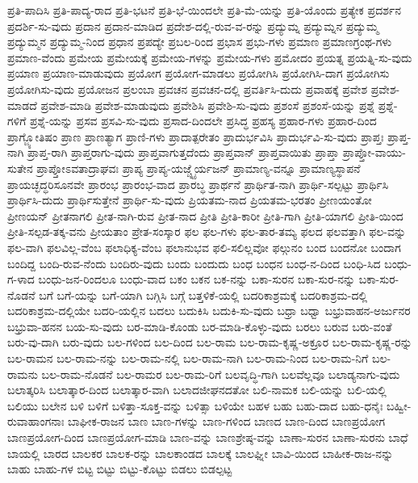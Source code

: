 {ಪ್ರತಿ-ಪಾದಿಸಿ
ಪ್ರತಿ-ಪಾದ್ಯ-ರಾದ
ಪ್ರತಿ-ಭಟನೆ
ಪ್ರತಿ-ಭೆ-ಯಿಂದಲೇ
ಪ್ರತಿ-ಮೆ-ಯನ್ನು
ಪ್ರತಿ-ಯೊಂದು
ಪ್ರತ್ಯೇಕ
ಪ್ರದರ್ಶನ
ಪ್ರದರ್ಶಿ-ಸು-ವುದು
ಪ್ರದಾನ
ಪ್ರದಾನ-ಮಾಡಿದ
ಪ್ರದೇಶ-ದಲ್ಲಿ-ರುವ-ವ-ರನ್ನು
ಪ್ರದ್ಯುಮ್ನ
ಪ್ರದ್ಯುಮ್ನನ
ಪ್ರದ್ಯುಮ್ಮ
ಪ್ರದ್ಯುಮ್ಮನ
ಪ್ರದ್ಯುಮ್ಮ-ನಿಂದ
ಪ್ರಧಾನ
ಪ್ರಪದ್ಯೇ
ಪ್ರಬಲ-ರಿಂದ
ಪ್ರಭಾಸ
ಪ್ರಭು-ಗಳು
ಪ್ರಮಾಣ
ಪ್ರಮಾಣಗ್ರಂಥ-ಗಳು
ಪ್ರಮಾಣ-ವೆಂದು
ಪ್ರಮೇಯ
ಪ್ರಮೇಯಕ್ಕೆ
ಪ್ರಮೇಯ-ಗಳನ್ನು
ಪ್ರಮೇಯ-ಗಳು
ಪ್ರಮೋದಂ
ಪ್ರಯತ್ನ
ಪ್ರಯತ್ನಿ-ಸು-ವುದು
ಪ್ರಯಾಣ
ಪ್ರಯಾಣ-ಮಾಡುವುದು
ಪ್ರಯೋಗ
ಪ್ರಯೋಗ-ಮಾಡಲು
ಪ್ರಯೋಗಿಸಿ
ಪ್ರಯೋಗಿಸಿ-ದಾಗ
ಪ್ರಯೋಗಿಸು
ಪ್ರಯೋಗಿಸು-ವುದು
ಪ್ರಯೋಜನ
ಪ್ರಲಂಬಾ
ಪ್ರವಚನ
ಪ್ರವಚನ-ದಲ್ಲಿ
ಪ್ರವರ್ತಿಸಿ-ದುದು
ಪ್ರವಾಹಕ್ಕೆ
ಪ್ರವೇಶ
ಪ್ರವೇಶ-ಮಾಡದೆ
ಪ್ರವೇಶ-ಮಾಡಿ
ಪ್ರವೇಶ-ಮಾಡುವುದು
ಪ್ರವೇಶಿಸಿ
ಪ್ರವೇಶಿ-ಸು-ವುದು
ಪ್ರಶಂಸೆ
ಪ್ರಶಂಸೆ-ಯನ್ನು
ಪ್ರಶ್ನೆ
ಪ್ರಶ್ನೆ-ಗಳಿಗೆ
ಪ್ರಶ್ನೆ-ಯನ್ನು
ಪ್ರಸವ
ಪ್ರಸವಿ-ಸು-ವುದು
ಪ್ರಸಾದ-ದಿಂದಲೇ
ಪ್ರಸಿದ್ಧ
ಪ್ರಹಸ್ಯ
ಪ್ರಹಾರ-ಗಳು
ಪ್ರಹಾರ-ದಿಂದ
ಪ್ರಾಗ್ಜ್ಯೋತಿಷಂ
ಪ್ರಾಣ
ಪ್ರಾಣತ್ಯಾಗ
ಪ್ರಾಣಿ-ಗಳು
ಪ್ರಾದಾತ್ಪರೇತಂ
ಪ್ರಾದುರ್ಭವಿಸಿ
ಪ್ರಾದುರ್ಭವಿ-ಸು-ವುದು
ಪ್ರಾಪ್ತಃ
ಪ್ರಾಪ್ತ-ನಾಗಿ
ಪ್ರಾಪ್ತ-ರಾಗಿ
ಪ್ರಾಪ್ತರಾಗು-ವುದು
ಪ್ರಾಪ್ತವಾಗುತ್ತದೆಂದು
ಪ್ರಾಪ್ತವಾನ್
ಪ್ರಾಪ್ತವಾಯಿತು
ಪ್ರಾಪ್ತಾ
ಪ್ರಾಪ್ತೋ-ವಾಯು-ಸುತೇನ
ಪ್ರಾಪ್ತೋಽವತಾದ್ರಾಘವಃ
ಪ್ರಾಪ್ಯ
ಪ್ರಾಪ್ಯ-ಯಜ್ಚ್ನೈರ್ಯಜನ್
ಪ್ರಾಮಾಣ್ಯ-ವನ್ನೂ
ಪ್ರಾಮಾಣ್ಯಸ್ಥಾಪನೆ
ಪ್ರಾಯಚ್ಛದ್ಧರಿಸೂನವೇ
ಪ್ರಾರಂಭ
ಪ್ರಾರಂಭ-ವಾದ
ಪ್ರಾರಬ್ಧ
ಪ್ರಾರ್ಥನೆ
ಪ್ರಾರ್ಥಿತ-ನಾಗಿ
ಪ್ರಾರ್ಥಿ-ಸಲ್ಪಟ್ಟು
ಪ್ರಾರ್ಥಿಸಿ
ಪ್ರಾರ್ಥಿಸಿ-ದುದು
ಪ್ರಾರ್ಥಿಸುತ್ತೇನೆ
ಪ್ರಾರ್ಥಿ-ಸು-ವುದು
ಪ್ರಿಯತಮ-ನಾದ
ಪ್ರಿಯತಮ-ಭರತಂ
ಪ್ರೀಣಯಂತೋ
ಪ್ರೀಣಯನ್
ಪ್ರೀತನಾಗಲಿ
ಪ್ರೀತ-ನಾಗಿ-ರುವ
ಪ್ರೀತ-ನಾದ
ಪ್ರೀತಿ
ಪ್ರೀತಿ-ಕಾರೀ
ಪ್ರೀತಿ-ಗಾಗಿ
ಪ್ರೀತಿ-ಯಾಗಲಿ
ಪ್ರೀತಿ-ಯಿಂದ
ಪ್ರೀತಿ-ಸಲ್ಪಡ-ತಕ್ಕ-ವನು
ಪ್ರೀಯತಾಂ
ಪ್ರೇತ-ಸಂಸ್ಕಾರ
ಫಲ
ಫಲ-ಗಳು
ಫಲ-ತಾರ-ತಮ್ಯ
ಫಲದ
ಫಲವತ್ತಾಗಿ
ಫಲ-ವನ್ನು
ಫಲ-ವಾಗಿ
ಫಲವಿಲ್ಲ-ವೆಂಬ
ಫಲಾಧಿಕ್ಯ-ವೆಂಬ
ಫಲಾನುಭವ
ಫಲಿ-ಸಲಿಲ್ಲವೋ
ಫಲ್ಗುನಂ
ಬಂದ
ಬಂದನೋ
ಬಂದಾಗ
ಬಂದಿದ್ದ
ಬಂದಿ-ರುವ-ನೆಂದು
ಬಂದಿರು-ವುದು
ಬಂದು
ಬಂದುದು
ಬಂಧ
ಬಂಧನ
ಬಂಧ-ನ-ದಿಂದ
ಬಂಧಿ-ಸಿದ
ಬಂಧು-ಗ-ಳಾದ
ಬಂಧು-ಜನ-ರಿಂದಲೂ
ಬಂಧು-ವಾದ
ಬಕಂ
ಬಕನ
ಬಕ-ನನ್ನು
ಬಕಾ-ಸುರನ
ಬಕಾ-ಸುರ-ನನ್ನು
ಬಕಾ-ಸುರ-ನೊಡನೆ
ಬಗೆ
ಬಗೆ-ಯನ್ನು
ಬಗೆ-ಯಾಗಿ
ಬಗ್ಗಿಸಿ
ಬಗ್ಗೆ
ಬತ್ತಳಿಕೆ-ಯಲ್ಲಿ
ಬದರಿಕಾಶ್ರಮಕ್ಕೆ
ಬದರಿಕಾಶ್ರಮ-ದಲ್ಲಿ
ಬದರಿಕಾಶ್ರಮ-ದಲ್ಲಿಯೇ
ಬದರಿ-ಯಲ್ಲಿನ
ಬದಲು
ಬದುಕಿಸಿ
ಬದುಕಿ-ಸು-ವುದು
ಬಧ್ರಾ
ಬಧ್ವಾ
ಬಭ್ರುವಾಹನ-ಅರ್ಜುನರ
ಬಭ್ರುವಾ-ಹನನ
ಬಯ-ಸು-ವುದು
ಬರ-ಮಾಡಿ-ಕೊಂಡು
ಬರ-ಮಾಡಿ-ಕೊಳ್ಳು-ವುದು
ಬರಲು
ಬರುವ
ಬರು-ವಂತೆ
ಬರು-ವು-ದಾಗಿ
ಬರು-ವುದು
ಬಲ-ಗಳಿಂದ
ಬಲ-ದಿಂದ
ಬಲ-ರಾಮ
ಬಲ-ರಾಮ-ಕೃಷ್ಣ-ಅಕ್ರೂರ
ಬಲ-ರಾಮ-ಕೃಷ್ಣ-ರನ್ನು
ಬಲ-ರಾಮನ
ಬಲ-ರಾಮ-ನನ್ನು
ಬಲ-ರಾಮ-ನಲ್ಲಿ
ಬಲ-ರಾಮ-ನಾಗಿ
ಬಲ-ರಾಮ-ನಿಂದ
ಬಲ-ರಾಮ-ನಿಗೆ
ಬಲ-ರಾಮನು
ಬಲ-ರಾಮ-ನೊಡನೆ
ಬಲ-ರಾಮರ
ಬಲ-ರಾಮ-ರಿಗೆ
ಬಲವೃದ್ಧಿ-ಗಾಗಿ
ಬಲವೆಲ್ಲವೂ
ಬಲಾಡ್ಯನಾಗು-ವುದು
ಬಲಾತ್ಕರಿಸಿ
ಬಲಾತ್ಕಾರ-ದಿಂದ
ಬಲಾತ್ಕಾರ-ವಾಗಿ
ಬಲಾದಜೀಘನದತೋ
ಬಲಿ-ನಾಮಕ
ಬಲಿ-ಯನ್ನು
ಬಲಿ-ಯಲ್ಲಿ
ಬಲಿಯು
ಬಲೇನ
ಬಳಿ
ಬಳಿಗೆ
ಬಳಿತ್ತಾ-ಸೂಕ್ತ-ವನ್ನು
ಬಳಿತ್ಸಾ
ಬಳಿಯೇ
ಬಹಳ
ಬಹು
ಬಹು-ದಾದ
ಬಹು-ಧನೈಃ
ಬಹ್ವೀ-ರುವಾಹಾಂಗನಾಃ
ಬಾಘೀಕ-ರಾಜನ
ಬಾಣ
ಬಾಣ-ಗಳನ್ನು
ಬಾಣ-ಗಳಿಂದ
ಬಾಣದ
ಬಾಣ-ದಿಂದ
ಬಾಣಪ್ರಯೋಗ
ಬಾಣಪ್ರಯೋಗ-ದಿಂದ
ಬಾಣಪ್ರಯೋಗ-ಮಾಡಿ
ಬಾಣ-ವನ್ನು
ಬಾಣಶ್ರೇಷ್ಠ-ವನ್ನು
ಬಾಣಾ-ಸುರನ
ಬಾಣಾ-ಸುರನು
ಬಾಧೆ
ಬಾಯಲ್ಲಿ
ಬಾರದ
ಬಾಲಕರ
ಬಾಲಕ-ರನ್ನು
ಬಾಲಕಾಂಡದ
ಬಾಲಕ್ಕೆ
ಬಾಲಘ್ನೀ
ಬಾವಿ-ಯಿಂದ
ಬಾಹೀಕ-ರಾಜ-ನನ್ನು
ಬಾಹು
ಬಾಹು-ಗಳ
ಬಿಟ್ಟ
ಬಿಟ್ಟು
ಬಿಟ್ಟು-ಕೊಟ್ಟು
ಬಿಡಲು
ಬಿಡಲ್ಪಟ್ಟ
}
